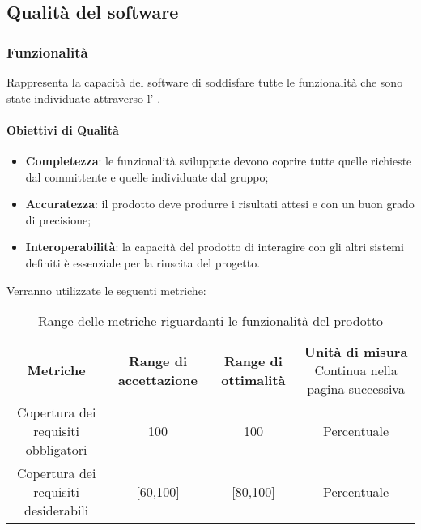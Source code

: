     \subsection{Qualità del software}
        \subsubsection{Funzionalità}
        Rappresenta la capacità del software di soddisfare tutte le funzionalità che sono state individuate attraverso l’ \docNameVersionAdR{}.
        \paragraph{Obiettivi di Qualità}
        \begin{itemize}
            \item \textbf{Completezza}: le funzionalità sviluppate devono coprire tutte quelle richieste dal committente e quelle individuate dal gruppo;
            \item \textbf{Accuratezza}: il prodotto deve produrre i risultati attesi e con un buon grado di precisione;
            \item \textbf{Interoperabilità}: la capacità del prodotto di interagire con gli altri sistemi definiti è essenziale per la riuscita del progetto.
        \end{itemize}
        Verranno utilizzate le seguenti metriche:
        
        \begin{center}
            \renewcommand{\arraystretch}{2.2}
            
            \begin{longtable}{c c c c}
              
              \rowcolor[HTML]{232f3e}
            
              \rowcolors{1}{tableRow}{}
              \color[HTML]{FFFFFF} \textbf{Metriche} & \color[HTML]{FFFFFF} \centering\textbf{Range di accettazione} & \color[HTML]{FFFFFF} \centering\textbf{Range di ottimalità} & \color[HTML]{FFFFFF} \centering\textbf{Unità di misura} 
            \endhead
            \rowcolor{white}\multicolumn{1}{c}
               { Continua nella pagina successiva} \\
               \endfoot
               \caption [Range delle metriche riguardanti le funzionalità del prodotto]{Range delle metriche riguardanti le funzionalità del prodotto}
              \label{tabella:reqP1}
               \endlastfoot
               Copertura dei requisiti obbligatori & 100 & 100 & Percentuale \\
               Copertura dei requisiti desiderabili & [60,100] & [80,100] & Percentuale  \\

            \end{longtable}

        \end{center}

